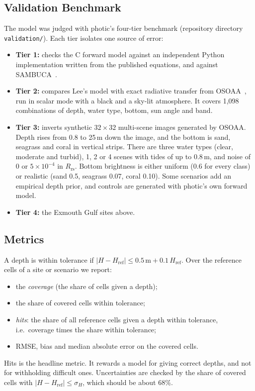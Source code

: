 \documentclass[remotesensing,article,submit,pdftex]{Definitions/mdpi}
\begin{document}
\subsection{Validation Benchmark}\label{sec:validation}

The model was judged with photic's four-tier benchmark (repository directory \texttt{validation/}). Each tier isolates one source of error:
\begin{itemize}
\item \textbf{Tier 1:} checks the C forward model against an independent Python implementation written from the published equations, and against SAMBUCA~\cite{wettle2006}.
\item \textbf{Tier 2:} compares Lee's model with exact radiative transfer from OSOAA~\cite{chami2015}, run in scalar mode with a black and a sky-lit atmosphere. It covers 1,098 combinations of depth, water type, bottom, sun angle and band.
\item \textbf{Tier 3:} inverts synthetic $32 \times 32$ multi-scene images generated by OSOAA. Depth rises from 0.8 to 25\,m down the image, and the bottom is sand, seagrass and coral in vertical strips. There are three water types (clear, moderate and turbid), 1, 2 or 4 scenes with tides of up to 0.8\,m, and noise of 0 or $5\times10^{-4}$ in $R_\mathrm{rs}$. Bottom brightness is either uniform (0.6 for every class) or realistic (sand 0.5, seagrass 0.07, coral 0.10). Some scenarios add an empirical depth prior, and controls are generated with photic's own forward model.
\item \textbf{Tier 4:} the Exmouth Gulf sites above.
\end{itemize}

\subsection{Metrics}\label{sec:metrics}

A depth is within tolerance if $|H - H_\mathrm{ref}| \le 0.5\,\mathrm{m} + 0.1\,H_\mathrm{ref}$. Over the reference cells of a site or scenario we report:
\begin{itemize}
\item the \emph{coverage} (the share of cells given a depth);
\item the share of covered cells within tolerance;
\item \emph{hits}: the share of all reference cells given a depth within tolerance, i.e.\ coverage times the share within tolerance;
\item RMSE, bias and median absolute error on the covered cells.
\end{itemize}
Hits is the headline metric. It rewards a model for giving correct depths, and not for withholding difficult ones. Uncertainties are checked by the share of covered cells with $|H - H_\mathrm{ref}| \le \sigma_H$, which should be about 68\%.
\end{document}

